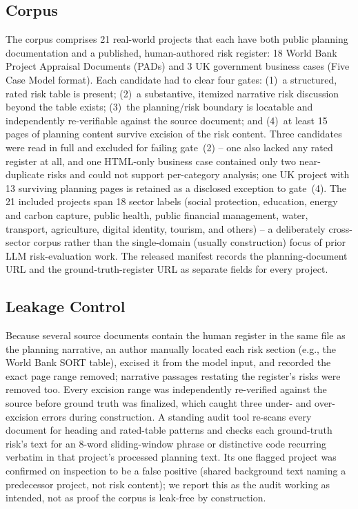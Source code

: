 \documentclass[10pt, conference, letterpaper]{IEEEtran}
\begin{document}
\subsection{Corpus}
The corpus comprises 21 real-world projects that each have both public
planning documentation and a published, human-authored risk register: 18
World Bank Project Appraisal Documents (PADs) and 3 UK government business
cases (Five Case Model format). Each candidate had to clear four gates:
(1)~a structured, rated risk table is present; (2)~a substantive, itemized
narrative risk discussion beyond the table exists; (3)~the planning/risk
boundary is locatable and independently re-verifiable against the source
document; and (4)~at least 15 pages of planning content survive excision of
the risk content. Three candidates were read in full and excluded for
failing gate~(2) -- one also lacked any rated register at all, and one
HTML-only business case contained only two near-duplicate risks and could
not support per-category analysis; one UK project with 13 surviving
planning pages is retained as a disclosed exception to gate~(4). The 21
included projects span 18 sector labels (social protection, education,
energy and carbon capture, public health, public financial management,
water, transport, agriculture, digital identity, tourism, and others) -- a
deliberately cross-sector corpus rather than the single-domain (usually
construction) focus of prior LLM risk-evaluation work. The released
manifest records the planning-document URL and the ground-truth-register
URL as separate fields for every project.

\subsection{Leakage Control}
Because several source documents contain the human register in the same
file as the planning narrative, an author manually located each risk
section (e.g., the World Bank SORT table), excised it from the model input,
and recorded the exact page range removed; narrative passages restating the
register's risks were removed too. Every excision range was independently
re-verified against the source before ground truth was finalized, which
caught three under- and over-excision errors during construction. A
standing audit tool re-scans every document for heading and rated-table
patterns and checks each ground-truth risk's text for an 8-word
sliding-window phrase or distinctive code recurring verbatim in that
project's processed planning text. Its one flagged project was confirmed on
inspection to be a false positive (shared background text naming a
predecessor project, not risk content); we report this as the audit
working as intended, not as proof the corpus is leak-free by construction.
\end{document}
